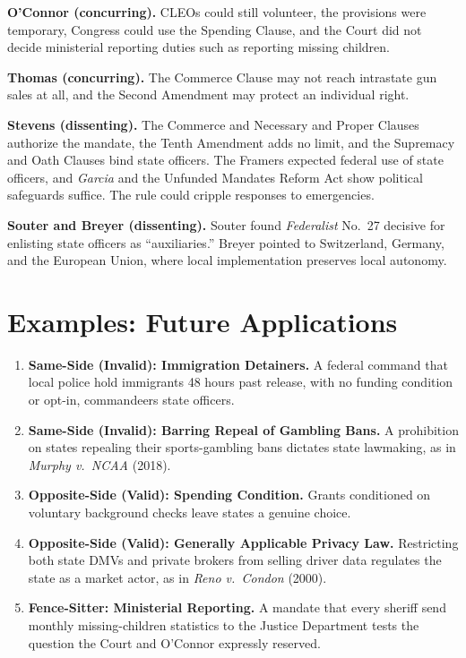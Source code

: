 \documentclass[12pt]{article}
\begin{document}
\textbf{O'Connor (concurring).} CLEOs could still volunteer, the provisions were temporary, Congress could use the Spending Clause, and the Court did not decide ministerial reporting duties such as reporting missing children.

\textbf{Thomas (concurring).} The Commerce Clause may not reach intrastate gun sales at all, and the Second Amendment may protect an individual right.

\textbf{Stevens (dissenting).} The Commerce and Necessary and Proper Clauses authorize the mandate, the Tenth Amendment adds no limit, and the Supremacy and Oath Clauses bind state officers. The Framers expected federal use of state officers, and \textit{Garcia} and the Unfunded Mandates Reform Act show political safeguards suffice. The rule could cripple responses to emergencies.

\textbf{Souter and Breyer (dissenting).} Souter found \textit{Federalist} No.\ 27 decisive for enlisting state officers as ``auxiliaries.'' Breyer pointed to Switzerland, Germany, and the European Union, where local implementation preserves local autonomy.

\section{Examples: Future Applications}

\begin{enumerate}
\item \textbf{Same-Side (Invalid): Immigration Detainers.} A federal command that local police hold immigrants 48 hours past release, with no funding condition or opt-in, commandeers state officers.
\item \textbf{Same-Side (Invalid): Barring Repeal of Gambling Bans.} A prohibition on states repealing their sports-gambling bans dictates state lawmaking, as in \textit{Murphy v.\ NCAA} (2018).
\item \textbf{Opposite-Side (Valid): Spending Condition.} Grants conditioned on voluntary background checks leave states a genuine choice.
\item \textbf{Opposite-Side (Valid): Generally Applicable Privacy Law.} Restricting both state DMVs and private brokers from selling driver data regulates the state as a market actor, as in \textit{Reno v.\ Condon} (2000).
\item \textbf{Fence-Sitter: Ministerial Reporting.} A mandate that every sheriff send monthly missing-children statistics to the Justice Department tests the question the Court and O'Connor expressly reserved.
\end{enumerate}
\end{document}
